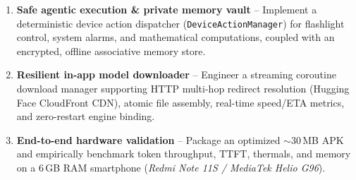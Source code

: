 \documentclass[11pt]{article}
\begin{document}
\begin{enumerate}[leftmargin=1.6em, itemsep=3pt]
    \item \textbf{Safe agentic execution \& private memory vault} -- Implement a deterministic
    device action dispatcher (\texttt{DeviceActionManager}) for flashlight control, system alarms,
    and mathematical computations, coupled with an encrypted, offline associative memory store.
    \item \textbf{Resilient in-app model downloader} -- Engineer a streaming coroutine download
    manager supporting HTTP multi-hop redirect resolution (Hugging Face CloudFront CDN), atomic
    file assembly, real-time speed/ETA metrics, and zero-restart engine binding.
    \item \textbf{End-to-end hardware validation} -- Package an optimized $\sim$30\,MB APK and
    empirically benchmark token throughput, TTFT, thermals, and memory on a 6\,GB RAM smartphone
    (\textit{Redmi Note 11S / MediaTek Helio G96}).
\end{enumerate}

\end{document}

